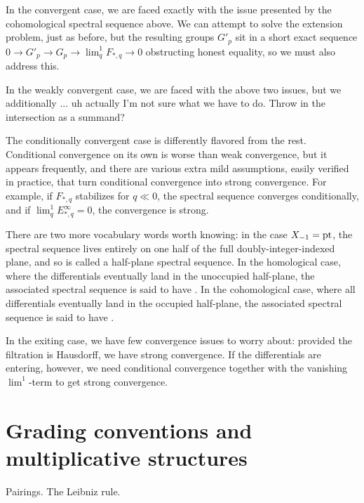 In the convergent case, we are faced exactly with the issue presented by the cohomological spectral sequence above.  We can attempt to solve the extension problem, just as before, but the resulting groups $G'_p$ sit in a short exact sequence $0 \to G'_p \to G_p \to \lim^1_q F_{*, q} \to 0$ obstructing honest equality, so we must also address this.

In the weakly convergent case, we are faced with the above two issues, but we additionally ... uh actually I'm not sure what we have to do.  Throw in the intersection as a summand?

The conditionally convergent case is differently flavored from the rest.  Conditional convergence on its own is worse than weak convergence, but it appears frequently, and there are various extra mild assumptions, easily verified in practice, that turn conditional convergence into strong convergence.  For example, if $F_{*, q}$ stabilizes for $q \ll 0$, the spectral sequence converges conditionally, and if $\lim^1_q E^\infty_{*, q} = 0$, the convergence is strong.

There are two more vocabulary words worth knowing: in the case $X_{-1} = \operatorname{pt}$, the spectral sequence lives entirely on one half of the full doubly-integer-indexed plane, and so is called a half-plane spectral sequence.  In the homological case, where the differentials eventually land in the unoccupied half-plane, the associated spectral sequence is said to have .  In the cohomological case, where all differentials eventually land in the occupied half-plane, the associated spectral sequence is said to have .

In the exiting case, we have few convergence issues to worry about: provided the filtration is Hausdorff, we have strong convergence.  If the differentials are entering, however, we need conditional convergence together with the vanishing $\lim^1$-term to get strong convergence.


\section{Grading conventions and multiplicative structures}

Pairings.  The Leibniz rule.
